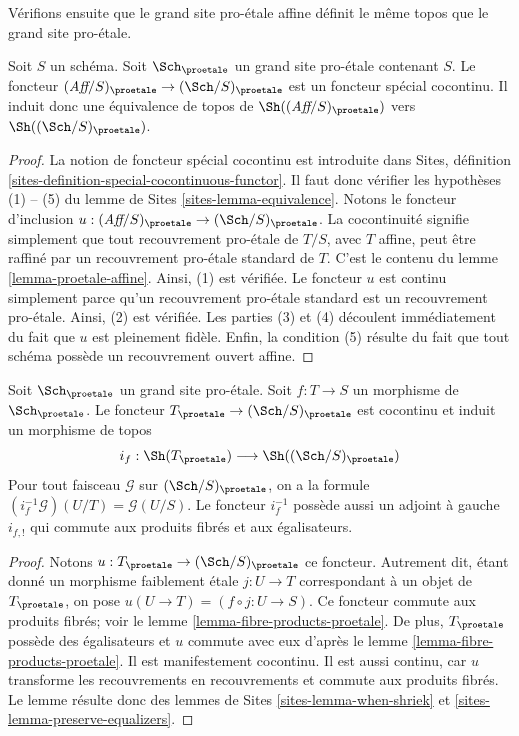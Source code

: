 \noindent
Vérifions ensuite que le grand site pro-\'etale affine définit le même
topos que le grand site pro-\'etale.

\begin{lemma}
\label{lemma-affine-big-site-proetale}
Soit $S$ un schéma. Soit $\Sch_\proetale$ un grand site pro-\'etale
contenant $S$.
Le foncteur $(\textit{Aff}/S)_\proetale \to (\Sch/S)_\proetale$
est un foncteur spécial cocontinu. Il induit donc une équivalence
de topos de $\Sh((\textit{Aff}/S)_\proetale)$ vers
$\Sh((\Sch/S)_\proetale)$.
\end{lemma}

\begin{proof}
La notion de foncteur spécial cocontinu est introduite dans
Sites, définition \ref{sites-definition-special-cocontinuous-functor}.
Il faut donc vérifier les hypothèses (1) -- (5) du
lemme de Sites \ref{sites-lemma-equivalence}.
Notons le foncteur d'inclusion
$u : (\textit{Aff}/S)_\proetale \to (\Sch/S)_\proetale$.
La cocontinuité signifie simplement que tout recouvrement pro-\'etale de
$T/S$, avec $T$ affine, peut être raffiné par un recouvrement pro-\'etale
standard de $T$. C'est le contenu du
lemme \ref{lemma-proetale-affine}.
Ainsi, (1) est vérifiée. Le foncteur $u$ est continu simplement parce qu'un recouvrement
pro-\'etale standard est un recouvrement pro-\'etale. Ainsi, (2) est vérifiée.
Les parties (3) et (4) découlent immédiatement du fait que $u$ est
pleinement fidèle. Enfin, la condition (5) résulte du
fait que tout schéma possède un recouvrement ouvert affine.
\end{proof}

\begin{lemma}
\label{lemma-put-in-T}
Soit $\Sch_\proetale$ un grand site pro-\'etale.
Soit $f : T \to S$ un morphisme de $\Sch_\proetale$.
Le foncteur $T_\proetale \to (\Sch/S)_\proetale$
est cocontinu et induit un morphisme de topos
$$
i_f :
\Sh(T_\proetale)
\longrightarrow
\Sh((\Sch/S)_\proetale)
$$
Pour tout faisceau $\mathcal{G}$ sur $(\Sch/S)_\proetale$,
on a la formule $(i_f^{-1}\mathcal{G})(U/T) = \mathcal{G}(U/S)$.
Le foncteur $i_f^{-1}$ possède aussi un adjoint à gauche $i_{f, !}$ qui commute
aux produits fibrés et aux égalisateurs.
\end{lemma}

\begin{proof}
Notons $u : T_\proetale \to (\Sch/S)_\proetale$ ce foncteur.
Autrement dit, étant donné un morphisme faiblement \'etale $j : U \to T$ correspondant
à un objet de $T_\proetale$, on pose $u(U \to T) = (f \circ j : U \to S)$.
Ce foncteur commute aux produits fibrés; voir le
lemme \ref{lemma-fibre-products-proetale}.
De plus, $T_\proetale$ possède des égalisateurs et $u$ commute avec eux
d'après le lemme \ref{lemma-fibre-products-proetale}.
Il est manifestement cocontinu.
Il est aussi continu, car $u$ transforme les recouvrements en recouvrements et
commute aux produits fibrés. Le lemme résulte donc des
lemmes de Sites \ref{sites-lemma-when-shriek}
et \ref{sites-lemma-preserve-equalizers}.
\end{proof}

